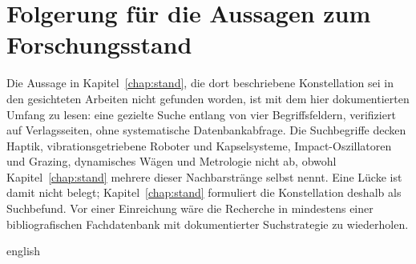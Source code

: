 \documentclass[12pt,a4paper]{report}
\begin{document}
\section{Folgerung für die Aussagen zum Forschungsstand}

Die Aussage in Kapitel~\ref{chap:stand}, die dort beschriebene
Konstellation sei in den gesichteten Arbeiten nicht gefunden worden, ist
mit dem hier dokumentierten Umfang zu lesen: eine gezielte Suche entlang von vier
Begriffsfeldern, verifiziert auf Verlagsseiten, ohne systematische
Datenbankabfrage. Die Suchbegriffe decken Haptik, vibrationsgetriebene
Roboter und Kapselsysteme, Impact-Oszillatoren und Grazing, dynamisches
Wägen und Metrologie nicht ab, obwohl Kapitel~\ref{chap:stand} mehrere
dieser Nachbarstränge selbst nennt. Eine Lücke ist damit nicht
belegt; Kapitel~\ref{chap:stand} formuliert die Konstellation deshalb als
Suchbefund. Vor einer Einreichung wäre die Recherche in mindestens einer
bibliografischen Fachdatenbank mit dokumentierter Suchstrategie zu
wiederholen.



\begin{otherlanguage*}{english}


\end{otherlanguage*}
\end{document}
